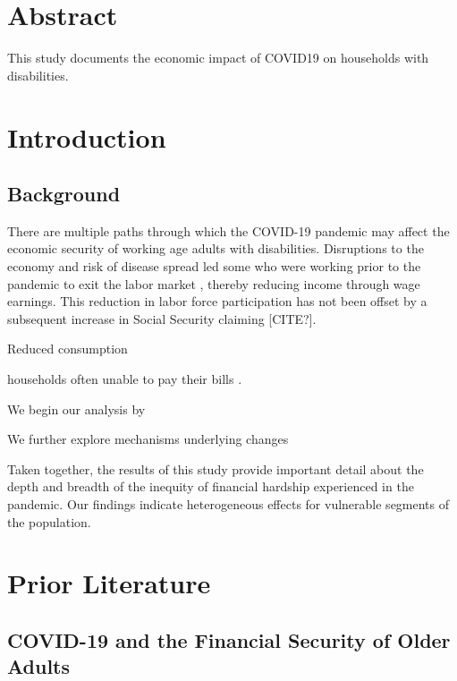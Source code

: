 \documentclass[12pt]{article}
\begin{document}
\cleardoublepage{}


\cleardoublepage{}

\linespread{1.25} 
\section*{Abstract}
This study documents the economic impact of COVID19 on households with disabilities.

\newpage 
 
\section{Introduction}

\subsection{Background}

 
 
 
There are multiple paths through which the COVID-19 pandemic may affect the economic security of working age adults with disabilities. Disruptions to the economy and risk of disease spread led some who were working prior to the pandemic to exit the labor market \citep{cheng2020back, goda2021impact moen2020disparate, quinby2021older }, thereby reducing income through wage earnings. This reduction in labor force participation has not been offset by a subsequent increase in Social Security  claiming [CITE?].   


Reduced consumption \citep{baker2020does,horvath2021covid} 

households often unable to pay their bills \citep{clark2021financial,schneider2020household}. 

  
We begin our analysis by  

We further explore mechanisms underlying changes 

 

Taken together, the results of this study provide important detail about the depth and breadth of the inequity of financial hardship experienced in the pandemic. Our findings indicate heterogeneous effects for vulnerable segments of the population.    


\section{ Prior Literature}

 

\subsection{COVID-19 and the Financial Security of Older Adults }
\end{document}
